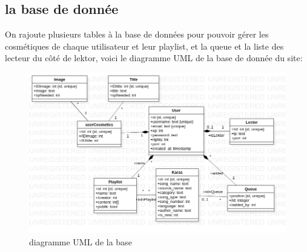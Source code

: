 \subsection{la base de donnée}
On rajoute plusieurs tables à la base de données pour pouvoir gérer les cosmétiques de chaque utilisateur et leur playlist, et la queue et la liste des lecteur du côté de lektor, voici le diagramme UML de la base de donnée du site:
\newline
\begin{figure}[h!]
\centering
\includegraphics[scale=0.4]{UML.png}
\caption{diagramme UML de la base}
\label{fig:diagramme UML}
\end{figure}
